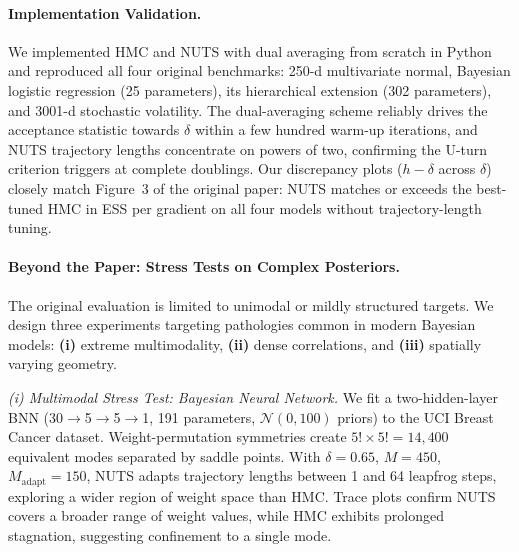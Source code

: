 \documentclass{article}
\begin{document}
\paragraph{Implementation Validation.}
We implemented HMC and NUTS with dual averaging from scratch in Python and reproduced all four original benchmarks: 250-d multivariate normal, Bayesian logistic regression (25 parameters), its hierarchical extension (302 parameters), and 3001-d stochastic volatility. The dual-averaging scheme reliably drives the acceptance statistic towards $\delta$ within a few hundred warm-up iterations, and NUTS trajectory lengths concentrate on powers of two, confirming the U-turn criterion triggers at complete doublings. Our discrepancy plots ($h - \delta$ across $\delta$) closely match Figure~3 of the original paper: NUTS matches or exceeds the best-tuned HMC in ESS per gradient on all four models without trajectory-length tuning.

\paragraph{Beyond the Paper: Stress Tests on Complex Posteriors.}
The original evaluation is limited to unimodal or mildly structured targets. We design three experiments targeting pathologies common in modern Bayesian models: \textbf{(i)} extreme multimodality, \textbf{(ii)} dense correlations, and \textbf{(iii)} spatially varying geometry.

\vspace{0.05cm}
\noindent\textit{(i) Multimodal Stress Test: Bayesian Neural Network.}
We fit a two-hidden-layer BNN (30$\to$5$\to$5$\to$1, 191 parameters, $\mathcal{N}(0,100)$ priors) to the UCI Breast Cancer dataset. Weight-permutation symmetries create $5!\times5!=14{,}400$ equivalent modes separated by saddle points. With $\delta=0.65$, $M=450$, $M_{\text{adapt}}=150$, NUTS adapts trajectory lengths between 1 and 64 leapfrog steps, exploring a wider region of weight space than HMC. Trace plots confirm NUTS covers a broader range of weight values, while HMC exhibits prolonged stagnation, suggesting confinement to a single mode.
\end{document}
